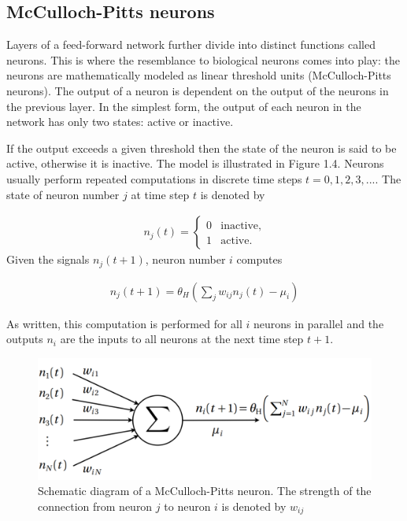 \subsection{McCulloch-Pitts neurons}

Layers of a feed-forward network further divide into distinct functions called neurons. This is where the resemblance to biological neurons comes into play: the neurons are mathematically modeled as linear threshold units (McCulloch-Pitts neurons). The output of a neuron is dependent on the output of the neurons in the previous layer. In the simplest form, the output of each neuron in the network has only two states: active or inactive. \cite{mehlig}

If the output exceeds a given threshold then the state of the neuron is said to be active, otherwise it is inactive. The model is illustrated in Figure 1.4. Neurons usually perform repeated computations in discrete time steps $ t = 0,1,2,3,.... $ The state of neuron number $ j $ at time step $ t $ is denoted by \cite{mehlig}

\begin{gather}
n_j(t) = 
	\begin{cases}	
		0 & \text{inactive,}\\
		1 & \text{active.}
	\end{cases} 
\end{gather}
\noindent Given the signals $ n_j(t+1) $, neuron number $ i $ computes \cite{mehlig}

\begin{gather}
\label{neuron_output}
n_j(t+1)=\theta_H \left(\sum\limits_{j}w_{ij}n_j(t) - \mu_i \right)
\end{gather}

As written, this computation is performed for all $ i $ neurons in parallel and the outputs $ n_i $ are the inputs to all neurons at the next time step $ t+1 $.

\newpage
\vspace{5mm}
\begin{figure}[htb]
	\begin{center}
		\includegraphics*[width=13cm, keepaspectratio]{obr/neuron.png}
	\end{center}
	\vspace{5mm}
	\caption{Schematic diagram of a McCulloch-Pitts neuron. The strength of the connection from
		neuron $ j $ to neuron $ i $ is denoted by $ w_{ij} $ \cite{mehlig}} 
	\label{neuron}
\end{figure}

